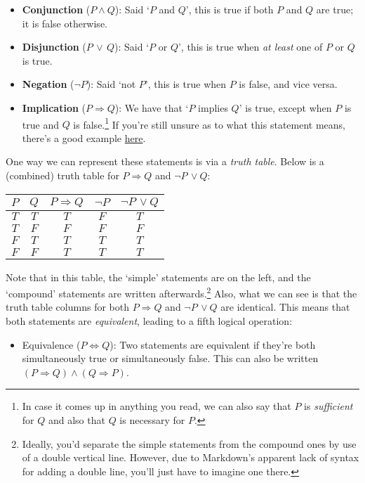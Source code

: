 \documentclass[
  12pt,
  a4paper]{extarticle}
\providecommand{\tightlist}{%
  \setlength{\itemsep}{0pt}\setlength{\parskip}{0pt}}
\theoremstyle{plain}
\theoremstyle{definition}
\theoremstyle{plain}
\theoremstyle{plain}
\theoremstyle{plain}
\theoremstyle{plain}
\theoremstyle{definition}
\theoremstyle{definition}
\newtheorem*{Order Axioms*}{Order Axioms}\newtheorem{Order Axioms}{Order Axioms}[section]
\theoremstyle{remark}
\theoremstyle{remark}
\renewcommand{\;}{\,}
\begin{document}
\begin{itemize}
\tightlist
\item
  \textbf{Conjunction} (\(P \wedge Q\)): Said `\(P\) and \(Q\)', this is true if both \(P\) and \(Q\) are true; it is false otherwise.
\item
  \textbf{Disjunction} (\(P \;\vee\; Q\)): Said `\(P\) or \(Q\)', this is true when \emph{at least} one of \(P\) or \(Q\) is true.
\item
  \textbf{Negation} (\(\neg P\)): Said `not \(P\)', this is true when \(P\) is false, and vice versa.
\item
  \textbf{Implication} (\(P\Rightarrow Q\)): We have that `\(P\) implies \(Q\)' is true, except when \(P\) is true and \(Q\) is false.\footnote{In case it comes up in anything you read, we can also say that \(P\) is \emph{sufficient} for \(Q\) and also that \(Q\) is necessary for \(P\).} If you're still unsure as to what this statement means, there's a good example \href{https://simple.wikipedia.org/wiki/Implication_(logic)}{here}.
\end{itemize}

One way we can represent these statements is via a \emph{truth table}. Below is a (combined) truth table for \(P \Rightarrow Q\) and \(\neg P \;\vee Q\):

\begin{longtable}[]{@{}ccccc@{}}
\toprule
\(P\) & \(Q\) & \(P \Rightarrow Q\) & \(\neg P\) & \(\neg P \; \vee Q\) \\
\midrule
\endhead
\(T\) & \(T\) & \(T\) & \(F\) & \(T\) \\
\(T\) & \(F\) & \(F\) & \(F\) & \(F\) \\
\(F\) & \(T\) & \(T\) & \(T\) & \(T\) \\
\(F\) & \(F\) & \(T\) & \(T\) & \(T\) \\
\bottomrule
\end{longtable}

Note that in this table, the `simple' statements are on the left, and the `compound' statements are written afterwards.\footnote{Ideally, you'd separate the simple statements from the compound ones by use of a double vertical line. However, due to Markdown's apparent lack of syntax for adding a double line, you'll just have to imagine one there.} Also, what we can see is that the truth table columns for both \(P \Rightarrow Q\) and \(\neg P \;\vee Q\) are identical. This means that both statements are \emph{equivalent}, leading to a fifth logical operation:

\begin{itemize}
\tightlist
\item
  Equivalence (\(P \Leftrightarrow Q\)): Two statements are equivalent if they're both simultaneously true or simultaneously false. This can also be written \((P \Rightarrow Q) \wedge (Q \Rightarrow P)\).
\end{itemize}
\end{document}
